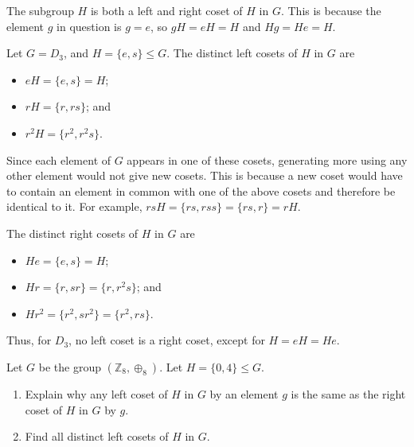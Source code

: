 \begin{remark}
    The subgroup $H$ is both a left and right coset of $H$ in $G$. This is because the element $g$ in question is $g = e$, so $gH = eH = H$ and $Hg = He = H$.
\end{remark}

\begin{example}
    Let $G = D_3$, and $H = \{e, s\} \leq G$. The distinct left cosets of $H$ in $G$ are
    \begin{itemize}
        \item $eH = \{e, s\} = H$;
        \item $rH = \{r, rs\}$; and
        \item $r^2H = \{r^2, r^2s\}$.
    \end{itemize}
    Since each element of $G$ appears in one of these cosets, generating more using any other element would not give new cosets. This is because a new coset would have to contain an element in common with one of the above cosets and therefore be identical to it. For example, $rsH = \{rs, rss\} = \{rs, r\} = rH$.

    The distinct right cosets of $H$ in $G$ are
    \begin{itemize}
        \item $He = \{e, s\} = H$;
        \item $Hr = \{r, sr\} = \{r, r^2s\}$; and
        \item $Hr^2 = \{r^2, sr^2\} = \{r^2, rs\}$.
    \end{itemize}
    Thus, for $D_3$, no left coset is a right coset, except for $H = eH = He$.
\end{example}

\begin{exercise}
    Let $G$ be the group $(\mathbb{Z}_8, \oplus_8)$. Let $H = \{0, 4\} \leq G$.
    \begin{enumerate}[label=(\alph*)]
        \item Explain why any left coset of $H$ in $G$ by an element $g$ is the same as the right coset of $H$ in $G$ by $g$.
        \item Find all distinct left cosets of $H$ in $G$.
    \end{enumerate}
\end{exercise}

